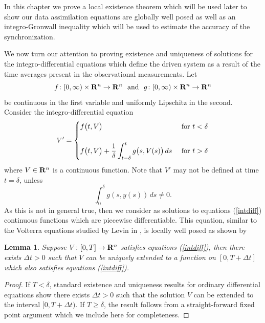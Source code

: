 \documentclass[master,tocprelim,12pt]{unrthesis}
\newtheorem{lemma}{Lemma}[chapter]
\theoremstyle{definition}
\newcommand{\R}{{\bf R}}
\numberwithin{equation}{chapter}
\begin{document}
\begin{manuscript}
In this chapter we prove a local existence theorem 
which will be used later to show our data assimilation 
equations are globally well posed as well as an
integro-Gronwall inequality which will be used to
estimate the accuracy of the synchronization. 

We now turn our attention to proving existence and
uniqueness of solutions for the integro-differential equations
which define the driven system as a result of the time averages
present in the observational measurements.
Let
$$
	f\colon [0,\infty)\times\R^n\to\R^n \
	\text{ and }\
 g\colon [0,\infty)\times\R^n\to\R^n$$
be continuous in the first variable and
uniformly Lipschitz in the second.
Consider the integro-differential equation
\begin{equation}\label{intdiff}
     V'=\begin{cases}
{\smallskip}
f\big(t, V\big) & \text { for } t<\delta\\\\
        f\big(t, V\big)
    +\displaystyle {1\over\delta}\int_{t-\delta}^t g\big(s, V(s)\big)\,ds &
    \text{ for } t>\delta\end{cases}
\end{equation}
where $ V\in\R^n$ is a continuous function.
Note that $ V'$ may not be defined at time $t=\delta$, 
unless
$$
	\int_0^\delta g(s,y(s))\,ds\ne 0.
$$
As this is not in general true, then we consider as solutions
to equations (\ref{intdiff}) continuous functions which are piecewise
differentiable.
This equation, similar to the
Volterra equations studied by Levin in \cite{Levin64},
is locally well posed as shown by 
\begin{lemma}\label{localexist}
Suppose $ V\colon [0,T]\to \R^n$ satisfies equations (\ref{intdiff}),
then there exists $\Delta t>0$ such that $ V$ can be uniquely extended to a function
on $[0,T+\Delta t]$ which also satisfies equations (\ref{intdiff}).
\end{lemma}

\begin{proof}
If $T<\delta$, standard existence and uniqueness results
for ordinary differential equations show there exists $\Delta t>0$ 
such that the solution $ V$ can be extended to the interval $[0,T+\Delta t)$.
If $T\ge\delta$, the result follows from a straight-forward 
fixed point argument which we include here for completeness.


\end{proof}
\end{manuscript}
\end{document}
